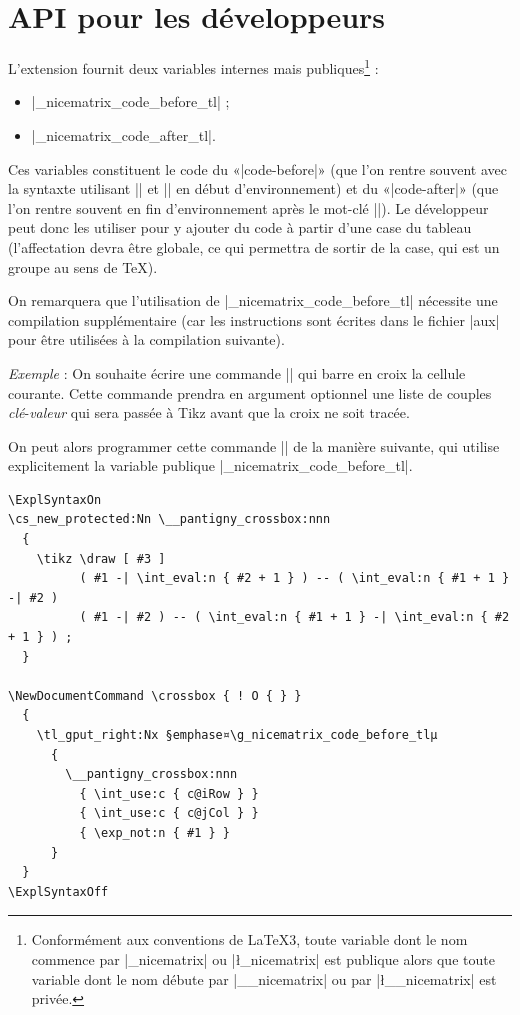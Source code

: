 \documentclass[dvipsnames]{article}%
\begin{document}
\section{API pour les développeurs}

L'extension  fournit deux variables internes mais publiques\footnote{Conformément aux conventions de LaTeX3,
  toute variable dont le nom commence par |\g_nicematrix| ou |\l_nicematrix| est
  publique alors que toute variable dont le nom débute par |\g__nicematrix| ou
  par |\l__nicematrix| est privée.} :
\begin{itemize}
\item |\g_nicematrix_code_before_tl| ;
\item |\g_nicematrix_code_after_tl|.
\end{itemize}

\medskip
Ces variables constituent le code du «|code-before|» (que l'on rentre souvent
avec la syntaxte utilisant |\CodeBefore| et |\Body| en début d'environnement) et
du «|code-after|» (que l'on rentre souvent en fin d'environnement après le
mot-clé |\CodeAfter|). Le développeur peut donc les utiliser pour y ajouter du
code à partir d'une case du tableau (l'affectation devra être globale, ce qui
permettra de sortir de la case, qui est un groupe au sens de TeX).

\medskip
On remarquera que l'utilisation de |\g_nicematrix_code_before_tl| nécessite une
compilation supplémentaire (car les instructions sont écrites dans le fichier
|aux| pour être utilisées à la compilation suivante).




\medskip
\emph{Exemple} : On souhaite écrire une commande |\crossbox| qui barre en croix
la cellule courante. Cette commande prendra en argument optionnel une liste de
couples \textsl{clé}-\textsl{valeur} qui sera passée à Tikz avant que la croix
ne soit tracée.


On peut alors programmer cette commande |\crossbox| de la manière suivante, qui
utilise explicitement la variable publique |\g_nicematrix_code_before_tl|.


\begin{scope}
\begin{Verbatim}
\ExplSyntaxOn
\cs_new_protected:Nn \__pantigny_crossbox:nnn
  {
    \tikz \draw [ #3 ]
          ( #1 -| \int_eval:n { #2 + 1 } ) -- ( \int_eval:n { #1 + 1 } -| #2 )
          ( #1 -| #2 ) -- ( \int_eval:n { #1 + 1 } -| \int_eval:n { #2 + 1 } ) ;
  }

\NewDocumentCommand \crossbox { ! O { } }
  {
    \tl_gput_right:Nx §emphase¤\g_nicematrix_code_before_tlμ
      {
        \__pantigny_crossbox:nnn
          { \int_use:c { c@iRow } }
          { \int_use:c { c@jCol } }
          { \exp_not:n { #1 } }
      }
  }
\ExplSyntaxOff
\end{Verbatim}
\end{scope}
\end{document}
